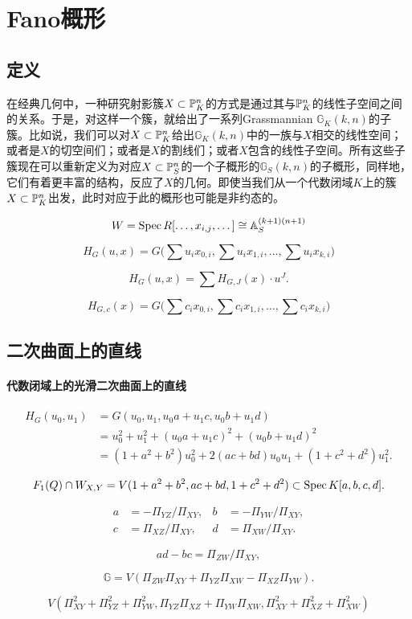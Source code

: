 \section{Fano概形}\label{s:4.3}
\subsection{定义}\label{s:4.3.1}

在经典几何中，一种研究射影簇$X\subset \mathbb{P}_K^n$的方式是通过其与$\mathbb{P}_K^n$的线性子空间之间的关系。于是，对这样一个簇，就给出了一系列Grassmannian $\mathbb G_K(k,n)$的子簇。比如说，我们可以对$X\subset \mathbb{P}_K^n$给出$\mathbb G_K(k,n)$中的一族与$X$相交的线性空间；或者是$X$的切空间们；或者是$X$的割线们；或者$X$包含的线性子空间。所有这些子簇现在可以重新定义为对应$X\subset \mathbb{P}_S^n$的一个子概形的$\mathbb G_S(k,n)$的子概形，同样地，它们有着更丰富的结构，反应了$X$的几何。即使当我们从一个代数闭域$K$上的簇$X\subset \mathbb{P}_K^n$出发，此时对应于此的概形也可能是非约态的。

\nottran


\[
	W=\operatorname{Spec} R[\dots,x_{i,j},\dots]\cong \mathbb{A}_S^{(k+1)(n+1)}
\]

\[
	H_G(u,x)=G\bigl(\sum u_ix_{0,i},\sum u_ix_{1,i},\dots,\sum u_ix_{k,i}\bigr)
\]

\[
	H_G(u,x)=\sum H_{G,J}(x)\cdot u^J.
\]

\[
	H_{G,c}(x)=G\bigl(\sum c_ix_{0,i},\sum c_ix_{1,i},\dots,\sum c_ix_{k,i}\bigr)
\]


\subsection{二次曲面上的直线}\label{s:4.3.2}

\paragraph*{代数闭域上的光滑二次曲面上的直线}

\[
	\begin{aligned}
		H_G(u_0,u_1)&=G(u_0,u_1,u_0a+u_1c,u_0b+u_1d)\\
		&=u_0^2+u_1^2+(u_0a+u_1c)^2+(u_0b+u_1d)^2\\
		&=(1+a^2+b^2)u_0^2+2(ac+bd)u_0u_1+(1+c^2+d^2)u_1^2.
	\end{aligned}
\]

\[
	F_1(Q)\cap W_{X,Y}=V(1+a^2+b^2,ac+bd,1+c^2+d^2)\subset \operatorname{Spec} K[a,b,c,d].
\]


\[
	\begin{aligned}
		a&=-\Pi_{YZ}/\Pi_{XY},&b&=-\Pi_{YW}/\Pi_{XY},\\
		c&=\Pi_{XZ}/\Pi_{XY},&d&=\Pi_{XW}/\Pi_{XY}.
	\end{aligned}
\]

\[
	ad-bc=\Pi_{ZW}/\Pi_{XY},
\]

\[
	\mathbb G=V(\Pi_{ZW}\Pi_{XY}+\Pi_{YZ}\Pi_{XW}-\Pi_{XZ}\Pi_{YW}).
\]

\[
	V(\Pi_{XY}^2+\Pi_{YZ}^2+\Pi_{YW}^2,\Pi_{YZ}\Pi_{XZ}+\Pi_{YW}\Pi_{XW},\Pi_{XY}^2+\Pi_{XZ}^2+\Pi_{XW}^2)
\]